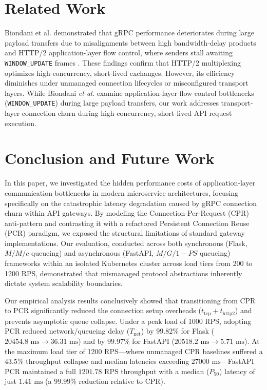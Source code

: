 \documentclass{ieeeaccess}
\begin{document}
	
	\section{Related Work}
	\label{sec:related-work}
	
	Biondani et al. demonstrated that gRPC performance deteriorates during large payload transfers due to misalignments between high bandwidth-delay products and HTTP/2 application-layer flow control, where senders stall awaiting \texttt{WINDOW\_UPDATE} frames \cite{biondani2026mate}. These findings confirm that HTTP/2 multiplexing optimizes high-concurrency, short-lived exchanges.  However, its efficiency diminishes under unmanaged connection lifecycles or misconfigured transport layers.  While Biondani \emph{et al.} \cite{biondani2026mate} examine application-layer flow control bottlenecks (\texttt{WINDOW\_UPDATE}) during large payload transfers, our work addresses transport-layer connection churn during high-concurrency, short-lived API request execution. 
	
	
	
	
	
	\section{Conclusion and Future Work}
	\label{sec:conclude}
	
	In this paper, we investigated the hidden performance costs of application-layer communication bottlenecks in modern microservice architectures, focusing specifically on the catastrophic latency degradation caused by gRPC connection churn within API gateways. By modeling the Connection-Per-Request (CPR) anti-pattern and contrasting it with a refactored Persistent Connection Reuse (PCR) paradigm, we exposed the structural limitations of standard gateway implementations. Our evaluation, conducted across both synchronous (Flask, $M/M/c$ queueing) and asynchronous (FastAPI, $M/G/1-PS$ queueing) frameworks within an isolated Kubernetes cluster across load tiers from 200 to 1200 RPS, demonstrated that mismanaged protocol abstractions inherently dictate system scalability boundaries. 
	
	Our empirical analysis results conclusively showed that transitioning from CPR to PCR significantly reduced the connection setup overheads ($t_{\text{tcp}} + t_{\text{http2}}$) and prevents asymptotic queue collapse. Under a peak load of 1000 RPS, adopting PCR reduced network/queueing delay ($T_{\text{net}}$) by $99.82\%$ for Flask ($20454.8\text{ ms} \to 36.31\text{ ms}$) and by $99.97\%$ for FastAPI ($20518.2\text{ ms} \to 5.71\text{ ms}$). At the maximum load tier of 1200 RPS—where unmanaged CPR baselines suffered a $43.5\%$ throughput collapse and median latencies exceeding $27000\text{ ms}$—FastAPI PCR maintained a full $1201.78\text{ RPS}$ throughput with a median ($P_{50}$) latency of just $1.41\text{ ms}$ (a $99.99\%$ reduction relative to CPR). 
	
\end{document}
